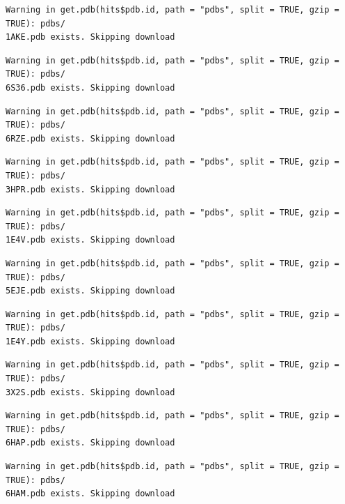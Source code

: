 \documentclass[
  letterpaper,
  DIV=11,
  numbers=noendperiod]{scrartcl}
\begin{document}
\begin{verbatim}
Warning in get.pdb(hits$pdb.id, path = "pdbs", split = TRUE, gzip = TRUE): pdbs/
1AKE.pdb exists. Skipping download
\end{verbatim}

\begin{verbatim}
Warning in get.pdb(hits$pdb.id, path = "pdbs", split = TRUE, gzip = TRUE): pdbs/
6S36.pdb exists. Skipping download
\end{verbatim}

\begin{verbatim}
Warning in get.pdb(hits$pdb.id, path = "pdbs", split = TRUE, gzip = TRUE): pdbs/
6RZE.pdb exists. Skipping download
\end{verbatim}

\begin{verbatim}
Warning in get.pdb(hits$pdb.id, path = "pdbs", split = TRUE, gzip = TRUE): pdbs/
3HPR.pdb exists. Skipping download
\end{verbatim}

\begin{verbatim}
Warning in get.pdb(hits$pdb.id, path = "pdbs", split = TRUE, gzip = TRUE): pdbs/
1E4V.pdb exists. Skipping download
\end{verbatim}

\begin{verbatim}
Warning in get.pdb(hits$pdb.id, path = "pdbs", split = TRUE, gzip = TRUE): pdbs/
5EJE.pdb exists. Skipping download
\end{verbatim}

\begin{verbatim}
Warning in get.pdb(hits$pdb.id, path = "pdbs", split = TRUE, gzip = TRUE): pdbs/
1E4Y.pdb exists. Skipping download
\end{verbatim}

\begin{verbatim}
Warning in get.pdb(hits$pdb.id, path = "pdbs", split = TRUE, gzip = TRUE): pdbs/
3X2S.pdb exists. Skipping download
\end{verbatim}

\begin{verbatim}
Warning in get.pdb(hits$pdb.id, path = "pdbs", split = TRUE, gzip = TRUE): pdbs/
6HAP.pdb exists. Skipping download
\end{verbatim}

\begin{verbatim}
Warning in get.pdb(hits$pdb.id, path = "pdbs", split = TRUE, gzip = TRUE): pdbs/
6HAM.pdb exists. Skipping download
\end{verbatim}
\end{document}
